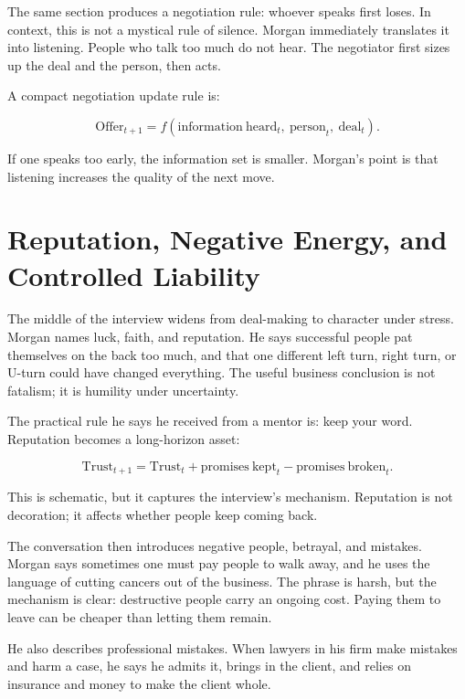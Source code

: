 The same section produces a negotiation rule: whoever speaks first loses. In context, this is not a mystical rule of silence. Morgan immediately translates it into listening. People who talk too much do not hear. The negotiator first sizes up the deal and the person, then acts.

A compact negotiation update rule is:

\begin{equation}
\mathrm{Offer}_{t+1}
=
f(\mathrm{information\ heard}_{t},\ \mathrm{person}_{t},\ \mathrm{deal}_{t}).
\end{equation}

If one speaks too early, the information set is smaller. Morgan's point is that listening increases the quality of the next move.

\section{Reputation, Negative Energy, and Controlled Liability}

The middle of the interview widens from deal-making to character under stress. Morgan names luck, faith, and reputation. He says successful people pat themselves on the back too much, and that one different left turn, right turn, or U-turn could have changed everything. The useful business conclusion is not fatalism; it is humility under uncertainty.

The practical rule he says he received from a mentor is: keep your word. Reputation becomes a long-horizon asset:

\begin{equation}
\mathrm{Trust}_{t+1}
=
\mathrm{Trust}_{t}
+
\mathrm{promises\ kept}_{t}
-
\mathrm{promises\ broken}_{t}.
\end{equation}

This is schematic, but it captures the interview's mechanism. Reputation is not decoration; it affects whether people keep coming back.

The conversation then introduces negative people, betrayal, and mistakes. Morgan says sometimes one must pay people to walk away, and he uses the language of cutting cancers out of the business. The phrase is harsh, but the mechanism is clear: destructive people carry an ongoing cost. Paying them to leave can be cheaper than letting them remain.

He also describes professional mistakes. When lawyers in his firm make mistakes and harm a case, he says he admits it, brings in the client, and relies on insurance and money to make the client whole.


